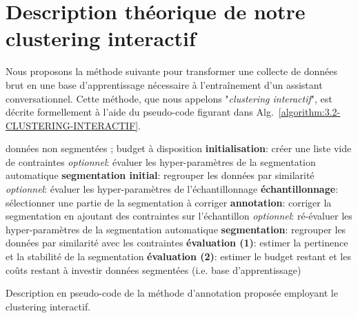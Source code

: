     \section{Description théorique de notre clustering interactif}
	\label{section:3.2-DESCRIPTION-THEORIQUE}
    
		Nous proposons la méthode suivante pour transformer une collecte de données brut en une base d'apprentissage nécessaire à l’entraînement d'un assistant conversationnel. Cette méthode, que nous appelons "\textit{clustering interactif}", est décrite formellement à l'aide du pseudo-code figurant dans Alg.~\ref{algorithm:3.2-CLUSTERING-INTERACTIF}.

		\begin{algorithm}[!htb]
		    \begin{algorithmic}[1]
		        \Require données non segmentées ; budget à disposition
				\State \textbf{initialisation}: créer une liste vide de contraintes
		        \State \textit{optionnel}: évaluer les hyper-paramètres de la segmentation automatique
		        \State \textbf{segmentation initial}: regrouper les données par similarité
		        \Repeat
		            \State \textit{optionnel}: évaluer les hyper-paramètres de l'échantillonnage
		            \State \textbf{échantillonnage}: sélectionner une partie de la segmentation à corriger
		            \State \textbf{annotation}: corriger la segmentation en ajoutant des contraintes sur l'échantillon
		            \State \textit{optionnel}: ré-évaluer les hyper-paramètres de la segmentation automatique
			        \State \textbf{segmentation}: regrouper les données par similarité avec les contraintes
			        \State \textbf{évaluation (1)}: estimer la pertinence et la stabilité de la segmentation
			        \State \textbf{évaluation (2)}: estimer le budget restant et les coûts restant à investir
		        \Ensure données segmentées (i.e. base d'apprentissage)
		    \end{algorithmic}
		    \caption{Description en pseudo-code de la méthode d'annotation proposée employant le clustering interactif.}
		    \label{algorithm:3.2-CLUSTERING-INTERACTIF}
		\end{algorithm}
		
